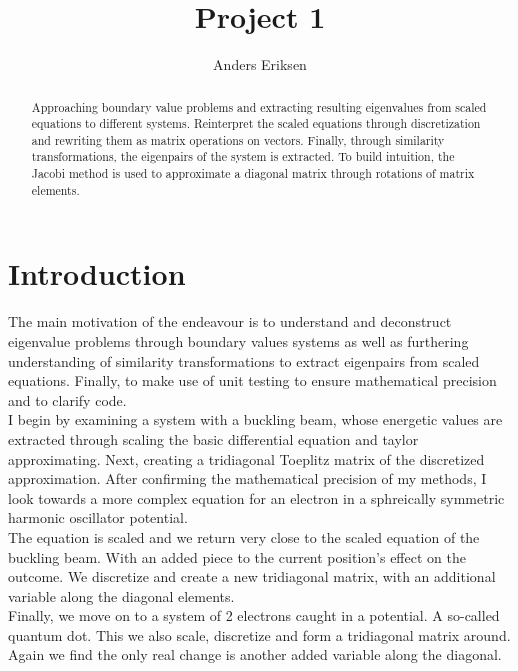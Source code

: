 \documentclass[10pt, twocolumn]{article}
\begin{document}
\nocite{andersgithub}
\title{Project 1}
\author{Anders Eriksen}

\maketitle

\begin{abstract}
    Approaching boundary value problems and extracting resulting eigenvalues from scaled 
    equations to different systems. Reinterpret the scaled equations through
    discretization and rewriting them as matrix operations on vectors. Finally, through
    similarity transformations, the eigenpairs of the system is extracted. To build
    intuition, the Jacobi method is used to approximate a diagonal matrix through 
    rotations of matrix elements.

\end{abstract}

\section{Introduction}
The main motivation of the endeavour is to understand and deconstruct eigenvalue problems through
boundary values systems as well as furthering understanding of similarity transformations to extract
eigenpairs from scaled equations. Finally, to make use of unit testing to ensure mathematical 
precision and to clarify code.\\

I begin by examining a system with a buckling beam, whose energetic values are extracted through 
scaling the basic differential equation and taylor approximating. Next, creating a tridiagonal 
Toeplitz matrix of the discretized approximation. After confirming the mathematical precision of my 
methods, I look towards a more complex equation for an electron in a sphreically symmetric harmonic
oscillator potential.\\
The equation is scaled and we return very close to the scaled equation of the
buckling beam. With an added piece to the current position's effect on the outcome. We discretize and 
create a new tridiagonal matrix, with an additional variable along the diagonal elements.\\
Finally, we move on to a system of 2 electrons caught in a potential. A so-called quantum dot. This we 
also scale, discretize and form a tridiagonal matrix around. Again we find the only real change is another added
variable along the diagonal. 
\end{document}
